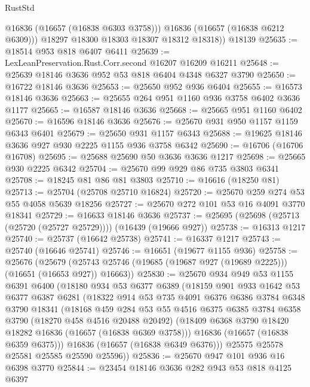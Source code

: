\begin{lexlean}{RustStd}
\begin{coremodule}
            @16836
            (@16657 (@16838 @6303 @3758)))
          @16836
          (@16657 (@16838 @6212 @6309)))
        @18297
        @18300
        @18303
        @18307
        @18312
        @18318))
    @18139
@25635 := @18514 @953 @818 @6407 @6411
@25639 := LexLeanPreservation.Rust.Corr.second @16207 @16209 @16211
@25648 := @25639 @18146 @3636 @952 @53 @818 @6404 @4348 @6327 @3790
@25650 := @16722 @18146 @3636
@25653 := @25650 @952 @936 @6404
@25655 := @16573 @18146 @3636
@25663 := @25655 @264 @951 @1160 @936 @3758 @6402 @3636 @1177
@25665 := @16587 @18146 @3636
@25668 := @25665 @951 @1160 @6402
@25670 := @16596 @18146 @3636
@25676 := @25670 @931 @950 @1157 @1159 @6343 @6401
@25679 := @25650 @931 @1157 @6343
@25688 := @19625 @18146 @3636 @927 @930 @2225 @1155 @936 @3758 @6342
@25690 := @16706 (@16706 @16708)
@25695 := @25688 @25690 @50 @3636 @3636 @1217
@25698 := @25665 @930 @2225 @6342
@25704 := @25670 @99 @929 @86 @735 @3803 @6341
@25708 := @18245 @81 @86 @81 @3803
@25710 := @16616 (@18250 @81)
@25713 := @25704 (@25708 @25710 @16824)
@25720 := @25670 @259 @274 @53 @55 @4058 @5639 @18256
@25727 := @25670 @272 @101 @53 @16 @4091 @3770 @18341
@25729 := @16633 @18146 @3636
@25737 := @25695 (@25698 (@25713 (@25720 (@25727 @25729)))) (@16439 (@19666 @927))
@25738 := @16313 @1217
@25740 := @25737 (@16642 @25738)
@25741 := @16337 @1217
@25743 := @25740 (@16646 @25741)
@25746 := @16651 (@19677 @1155 @936)
@25758 := @25676
    (@25679 (@25743 @25746 (@19685 (@19687 @927 (@19689 @2225))) (@16651 (@16653 @927)) @16663))
@25830 := @25670
    @934
    @949
    @53
    @1155
    @6391
    @6400
    (@18180
      @934
      @53
      @6377
      @6389
      (@18159
        @901
        @933
        @1642
        @53
        @6377
        @6387
        @6281
        (@18322
          @914
          @53
          @735
          @4091
          @6376
          @6386
          @3784
          @6348
          @3790
          @18341
          (@18168
            @459
            @284
            @53
            @55
            @4516
            @6375
            @6385
            @3784
            @6358
            @3790
            (@18270 @458 @4516 @20488 @20492)
            (@18409 @6368 @3790 @18420 @18282 @16836 (@16657 (@16838 @6369 @3758)))
            @16836
            (@16657 (@16838 @6359 @6375)))
          @16836
          (@16657 (@16838 @6349 @6376)))
        @25575
        @25578
        @25581
        @25585
        @25590
        @25596))
@25836 := @25670 @947 @101 @936 @16 @6398 @3770
@25844 := @23454 @18146 @3636 @282 @943 @53 @818 @4125 @6397

\end{coremodule}
\end{lexlean}
